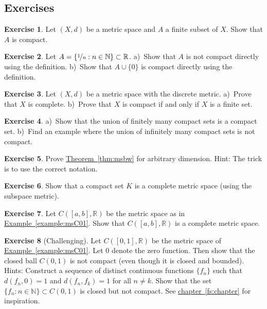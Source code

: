 \documentclass[12pt]{book}
\newcommand{\R}{{\mathbb{R}}}
\newcommand{\N}{{\mathbb{N}}}
\theoremstyle{plain}
\theoremstyle{remark}
\theoremstyle{definition}
\theoremstyle{exercise}
\newtheorem{exercise}{Exercise}[section]
\theoremstyle{example}
\newcommand{\chapterref}[1]{\hyperref[#1]{chapter~\ref*{#1}}}
\newcommand{\exampleref}[1]{\hyperref[#1]{Example~\ref*{#1}}}
\newcommand{\thmref}[1]{\hyperref[#1]{Theorem~\ref*{#1}}}
\begin{document}
\subsection{Exercises}

\begin{exercise}
Let $(X,d)$ be a metric space and $A$ a finite subset of $X$.
Show that $A$ is compact.
\end{exercise}

\begin{exercise}
Let $A = \{ \nicefrac{1}{n} : n \in \N \} \subset \R$.  a)~Show that $A$ is
not compact directly using the definition.  b)~Show that $A \cup \{ 0 \}$ is
compact directly using the definition.
\end{exercise}


\begin{exercise}
Let $(X,d)$ be a metric space with the discrete metric.  a)~Prove that
$X$ is complete.  b)~Prove that $X$ is compact if and only if $X$ is a finite
set.
\end{exercise}

\begin{exercise}
a)~Show that the union of finitely many compact sets is a compact set.
b)~Find an example where the union of infinitely many compact sets is not
compact.
\end{exercise}

\begin{exercise}
Prove \thmref{thm:msbw} for arbitrary dimension.
Hint: The trick is to use the correct notation.
\end{exercise}

\begin{exercise}
Show that a compact set $K$ is a complete metric space (using the subspace
metric).
\end{exercise}

\begin{exercise} \label{exercise:CabRcomplete}
Let $C([a,b],\R)$ be the metric space as in \exampleref{example:msC01}.  Show that
$C([a,b],\R)$ is a complete metric space.
\end{exercise}

\begin{exercise}[Challenging] \label{exercise:msclbounnotcompt}
Let $C([0,1],\R)$ be the metric space of \exampleref{example:msC01}.  Let $0$
denote the zero function.  Then show that the closed ball
$C(0,1)$ is not compact (even though it is closed and bounded).
Hints: Construct a sequence of distinct continuous functions $\{ f_n \}$ such that
$d(f_n,0) = 1$ and $d(f_n,f_k) = 1$ for all $n \not= k$.  Show that
the set $\{ f_n : n \in \N \} \subset C(0,1)$ is closed but not compact.
See \chapterref{fs:chapter} for inspiration.
\end{exercise}
\end{document}
